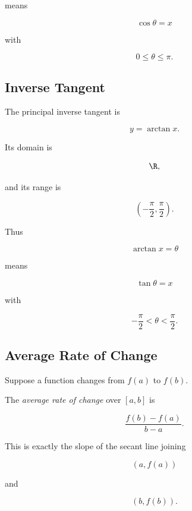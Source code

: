 means

\[ \cos\theta=x \]

with

\[ 0\leq\theta\leq\pi. \]

\subsection{Inverse Tangent}
\label{subsec:inverse-tangent}

The principal inverse tangent is

\[ y=\arctan x. \]

Its domain is

\[ \R, \]

and its range is

\[ \left(-\frac{\pi}{2},\frac{\pi}{2}\right). \]

Thus

\[ \arctan x=\theta \]

means

\[ \tan\theta=x \]

with

\[ -\frac{\pi}{2}<\theta<\frac{\pi}{2}. \]

\subsection{Average Rate of Change}
\label{subsec:average-rate-change}

Suppose a function changes from \(f(a)\) to \(f(b)\).

The \emph{average rate of change} over \([a,b]\) is

\[ \frac{f(b)-f(a)}{b-a}. \]

This is exactly the slope of the secant line joining

\[ (a,f(a)) \]

and

\[ (b,f(b)). \]

\begin{center}
\end{center}

